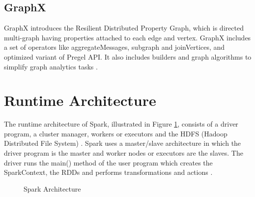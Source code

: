 \documentclass[9pt,twocolumn,twoside]{../../styles/osajnl}
\begin{document}
\subsection{GraphX}

GraphX introduces the Resilient Distributed Property
Graph, which is directed multi-graph having properties
attached to each edge and vertex. GraphX includes a set of
operators like aggregateMessages, subgraph and
joinVertices, and optimized variant of Pregel API. It also
includes builders and graph algorithms to simplify graph
analytics tasks \cite{article-spark-1}.

\section{Runtime Architecture}

The runtime architecture of Spark,  illustrated in Figure \ref{fig:spark-runtime}, consists of a driver program, a cluster manager, workers or executors and the HDFS (Hadoop Distributed File System) \cite{article-spark-1}.
Spark uses a master/slave architecture in which the driver program is the master and worker nodes or executors are the slaves. The driver runs the main() method of the user program which creates  the SparkContext, the RDDs and performs transformations and actions \cite{book-spark}.

\begin{figure}[htbp]
\centering
{}
\caption{Spark Architecture \cite{www-spark-cluster}}
\label{fig:spark-runtime}
\end{figure}
\end{document}
